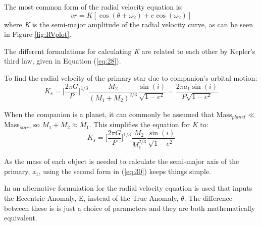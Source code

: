 \documentclass[12pt,preprint]{aastex}
\begin{document}
The most common form of the radial velocity equation is:
\begin{equation}\label{eq:rvStandard}
vr =  K[\cos(\theta+\omega_2)+e \cos(\omega_2)]
\end{equation}
where {\it K} is the semi-major amplitude of the radial velocity curve, as can be seen in Figure \ref{fig:RVplot}.

The different formulations for calculating {\it K} are related to each other by Kepler's third law, given in Equation (\ref{eq:28}).

To find the radial velocity of the primary star due to companion's orbital motion: %
\begin{equation}\label{eq:30}
K_s = \bigg[\frac{2\pi G}{P}\bigg]^{1/3}\frac{M_2}{(M_1+M_2)^{2/3}}\frac{\sin(i)}{\sqrt{1-e^2}} = \frac{2\pi a_1\sin(i)}{P\sqrt{1-e^2}}
\end{equation}

When the companion is a planet, it can commonly be assumed that Mass$_{planet} \ll$ Mass$_{star}$, so $M_1+M_2 \approx M_1$.  This simplifies the equation for {\it K} to:
\begin{equation}\label{eq:31}
K_s = \bigg[\frac{2\pi G}{P}\bigg]^{1/3}\frac{M_2}{M_1^{2/3}}\frac{\sin(i)}{\sqrt{1-e^2}}
\end{equation}

As the mass of each object is needed to calculate the semi-major axis of the primary, a$_1$, using the second form in (\ref{eq:30}) keeps things simple.



In \citet{Shulze-Hartung} an alternative formulation for the radial velocity equation is used that inputs the Eccentric Anomaly, E, instead of the True Anomaly, $\theta$.  The difference between these is is just a choice of parameters and they are both mathematically equivalent.
\end{document}
